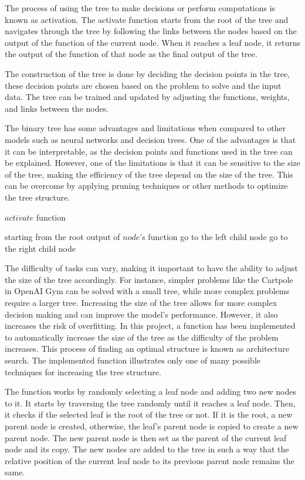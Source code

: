 The process of using the tree to make decisions or perform computations is known as activation. The activate function starts from the root of the tree and navigates through the tree by following the links between the nodes based on the output of the function of the current node. When it reaches a leaf node, it returns the output of the function of that node as the final output of the tree.

The construction of the tree is done by deciding the decision points in the tree, these decision points are chosen based on the problem to solve and the input data. The tree can be trained and updated by adjusting the functions, weights, and links between the nodes.

The binary tree has some advantages and limitations when compared to other models such as neural networks and decision trees. One of the advantages is that it can be interpretable, as the decision points and functions used in the tree can be explained. However, one of the limitations is that it can be sensitive to the size of the tree, making the efficiency of the tree depend on the size of the tree. This can be overcome by applying pruning techniques or other methods to optimize the tree structure.
\begin{algorithm}
\caption{$activate$ function}
\label{activate function}
\begin{algorithmic}[1]
\State starting from the root
    \Return output of $node$'s function 
    \State go to the left child node
\Else 
    \State go to the right child node
\EndIf
\EndWhile
\end{algorithmic}
\end{algorithm}
The difficulty of tasks can vary, making it important to have the ability to adjust the size of the tree accordingly. For instance, simpler problems like the Cartpole in OpenAI Gym can be solved with a small tree, while more complex problems require a larger tree. Increasing the size of the tree allows for more complex decision making and can improve the model's performance. However, it also increases the risk of overfitting.
In this project, a function has been implemented to automatically increase the size of the tree as the difficulty of the problem increases. This process of finding an optimal structure is known as architecture search. The implemented function illustrates only one of many possible techniques for increasing the tree structure.

The function works by randomly selecting a leaf node and adding two new nodes to it. It starts by traversing the tree randomly until it reaches a leaf node. Then, it checks if the selected leaf is the root of the tree or not. If it is the root, a new parent node is created, otherwise, the leaf's parent node is copied to create a new parent node. The new parent node is then set as the parent of the current leaf node and its copy. The new nodes are added to the tree in such a way that the relative position of the current leaf node to its previous parent node remains the same.

